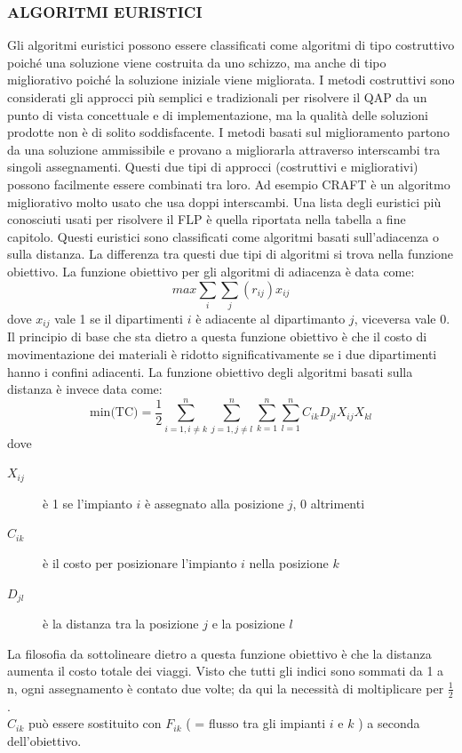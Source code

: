 \documentclass[12pt,a4paper,openright,twoside]{report}
\begin{document}
\subsubsection{ALGORITMI EURISTICI}
Gli algoritmi euristici possono essere classificati come algoritmi di tipo costruttivo poich\'{e} una soluzione viene costruita da uno schizzo, ma anche di tipo migliorativo poich\'{e} la soluzione iniziale viene migliorata. I metodi costruttivi sono considerati gli approcci pi\`{u} semplici e tradizionali per risolvere il QAP da un punto di vista concettuale e di implementazione, ma la qualit\`{a} delle soluzioni prodotte non \`{e} di solito soddisfacente. I metodi basati sul miglioramento partono da una soluzione ammissibile e provano a migliorarla attraverso interscambi tra singoli assegnamenti. Questi due tipi di approcci (costruttivi e migliorativi) possono facilmente essere combinati tra loro. Ad esempio CRAFT \`{e} un algoritmo migliorativo molto usato che usa doppi interscambi. Una lista degli euristici pi\`{u} conosciuti usati per risolvere il FLP \`{e} quella riportata nella tabella a fine capitolo. Questi euristici sono classificati come algoritmi basati sull'adiacenza o sulla distanza. La differenza tra questi due tipi di algoritmi si trova nella funzione obiettivo. La funzione obiettivo per gli algoritmi di adiacenza \`{e} data come:
$$max \sum_{i} \sum_{j} (r_{ij}) x_{ij}$$
dove $x_{ij}$ vale 1 se il dipartimenti $i$ \`{e} adiacente al dipartimanto $j$, viceversa vale 0.\\
Il principio di base che sta dietro a questa funzione obiettivo \`{e} che il costo di movimentazione dei materiali \`{e} ridotto significativamente se i due dipartimenti hanno i confini adiacenti. La funzione obiettivo degli algoritmi basati sulla distanza \`{e} invece data come:
$$\mbox{min(TC)} = \frac{1}{2} \sum_{i=1, i \neq k}^{n}\sum_{j=1, j\neq l}^{n}\sum_{k=1}^{n}\sum_{l=1}^{n} C_{ik} D_{jl} X_{ij} X_{kl}$$ dove
\begin{description}
\item [$X_{ij}$] \`{e} 1 se l'impianto $i$ \`{e} assegnato alla posizione $j$, 0 altrimenti
\item [$C_{ik}$] \`{e} il costo per posizionare l'impianto $i$ nella posizione $k$
\item [$D_{jl}$] \`{e} la distanza tra la posizione $j$ e la posizione $l$
\end{description}
La filosofia da sottolineare dietro a questa funzione obiettivo \`{e} che la distanza aumenta il costo totale dei viaggi. Visto che tutti gli indici sono sommati da 1 a n, ogni assegnamento \`{e} contato due volte; da qui la necessit\`{a} di moltiplicare per $\frac{1}{2}$.\\ $C_{ik}$ pu\`{o} essere sostituito con $F_{ik}$ ( = flusso tra gli impianti $i$ e $k$ ) a seconda dell'obiettivo.
\end{document}

